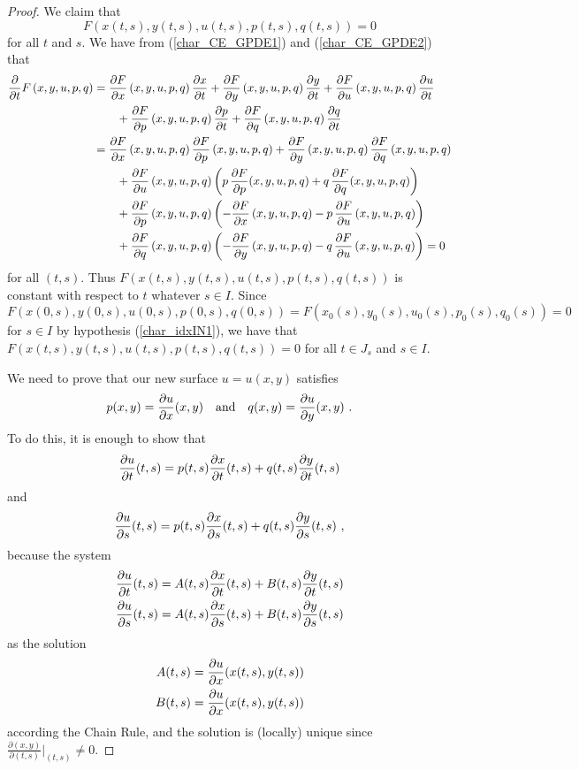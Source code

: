 \begin{proof}
 We claim that
\begin{equation} \label{char_idxCON3}
F\left(x(t,s),y(t,s),u(t,s),p(t,s),q(t,s)\right)=0
\end{equation}
for all $t$ and $s$.  We have from (\ref{char_CE_GPDE1}) and
(\ref{char_CE_GPDE2}) that
\begin{align*}
\pdfdx{F\left(x,y,u,p,q\right)}{t}
&= \pdydx{F}{x}\left(x,y,u,p,q\right)\pdydx{x}{t}
+\pdydx{F}{y}\left(x,y,u,p,q\right)\pdydx{y}{t}
+\pdydx{F}{u}\left(x,y,u,p,q\right)\pdydx{u}{t} \\
& \qquad +\pdydx{F}{p}\left(x,y,u,p,q\right)\pdydx{p}{t}
+\pdydx{F}{q}\left(x,y,u,p,q\right)\pdydx{q}{t} \\
&=\pdydx{F}{x}\left(x,y,u,p,q\right)\pdydx{F}{p}\left(x,y,u,p,q\right)
+\pdydx{F}{y}\left(x,y,u,p,q\right)\pdydx{F}{q}\left(x,y,u,p,q\right) \\
&\qquad +\pdydx{F}{u}\left(x,y,u,p,q\right)\left(
p\, \pdydx{F}{p}(x,y,u,p,q) + q\,\pdydx{F}{q}(x,y,u,p,q)\right) \\
&\qquad +\pdydx{F}{p}\left(x,y,u,p,q\right)\left(
-\pdydx{F}{x}\left(x,y,u,p,q\right) -p\,\pdydx{F}{u}\left(x,y,u,p,q\right)
\right) \\
&\qquad +\pdydx{F}{q}\left(x,y,u,p,q\right)\left(
-\pdydx{F}{y}\left(x,y,u,p,q\right)- q\,\pdydx{F}{u}\left(x,y,u,p,q\right)
\right) =0
\end{align*}
for all $(t,s)$.  Thus $F\left(x(t,s),y(t,s),u(t,s),p(t,s),q(t,s)\right)$
is constant with respect to $t$ whatever $s \in I$.  Since  
\[
F\left(x(0,s),y(0,s),u(0,s),p(0,s),q(0,s)\right)=
F\left(x_0(s),y_0(s),u_0(s),p_0(s),q_0(s)\right)= 0
\]
for $s\in I$ by hypothesis (\ref{char_idxIN1}), we have that
$F\left(x(t,s),y(t,s),u(t,s),p(t,s),q(t,s)\right) = 0$ for all $t \in J_s$
and $s\in  I$.

 We need to prove that our new surface $u=u(x,y)$ satisfies
\[
p(x,y) = \pdydx{u}{x}(x,y) \quad \text{and} \quad
q(x,y) = \pdydx{u}{y}(x,y) \ .
\]
To do this, it is enough to show that
\begin{equation} \label{char_idxCON2}
\pdydx{u}{t}(t,s) = p(t,s)\pdydx{x}{t}(t,s) + q(t,s) \pdydx{y}{t}(t,s)
\end{equation}
and
\begin{equation} \label{char_idxCON1}
\pdydx{u}{s}(t,s) = p(t,s)\pdydx{x}{s}(t,s) + q(t,s) \pdydx{y}{s}(t,s) \ ,
\end{equation}
because the system
\begin{align*}
\pdydx{u}{t}(t,s) &= A(t,s)\pdydx{x}{t}(t,s) + B(t,s)
\pdydx{y}{t}(t,s) \\
\pdydx{u}{s}(t,s) &= A(t,s)\pdydx{x}{s}(t,s) + B(t,s) \pdydx{y}{s}(t,s)
\end{align*}
as the solution
\begin{align*}
A(t,s) &= \pdydx{u}{x}(x(t,s),y(t,s)) \\
B(t,s) &= \pdydx{u}{x}(x(t,s),y(t,s))
\end{align*}
according the Chain Rule, and the solution is (locally) unique since
$\displaystyle \frac{\partial(x,y)}{\partial(t,s)}\bigg|_{(t,s)} \neq 0$.


\end{proof}
